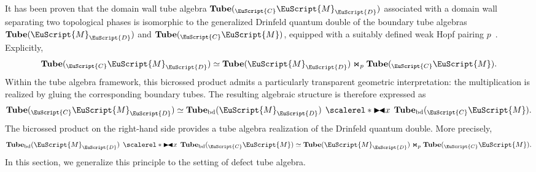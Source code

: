 \documentclass[a4paper,11pt]{article}
\theoremstyle{definition}
\theoremstyle{remark}
\newcommand\eC           {\EuScript{C}}
\newcommand\eD           {\EuScript{D}}
\newcommand\eM          {\EuScript{M}}
\newcommand\bicrosslr{%
	\mathrel{\scalerel*{\mathrel{\blacktriangleright}\joinrel\blacktriangleleft}{x}}}
\begin{document}
It has been proven that the domain wall tube algebra $\mathbf{Tube}({_{\eC}}\eM_{\eD})$ associated with a domain wall separating two topological phases is isomorphic to the generalized Drinfeld quantum double of the boundary tube algebras $\mathbf{Tube}(\eM_{\eD})$ and $\mathbf{Tube}({_{\eC}}\eM)$, equipped with a suitably defined weak Hopf pairing $p$~\cite{jia2025tube}. Explicitly,
\begin{equation}
    \mathbf{Tube}({_{\eC}}\eM_{\eD})
    \simeq
    \mathbf{Tube}(\eM_{\eD})
    \Join_{p}
    \mathbf{Tube}({_{\eC}}\eM).
\end{equation}
Within the tube algebra framework, this bicrossed product admits a particularly transparent geometric interpretation: the multiplication is realized by gluing the corresponding boundary tubes. The resulting algebraic structure is therefore expressed as
\begin{equation}
    \mathbf{Tube}({}_{\eC}\eM_{\eD})
    \simeq
    \mathbf{Tube}_{\rm bd}(\eM_{\eD})
    \,\bicrosslr\,
    \mathbf{Tube}_{\rm bd}({}_{\eC}\eM).
\end{equation}
The bicrossed product on the right-hand side provides a tube algebra realization of the Drinfeld quantum double. More precisely,
\begin{equation}
    \mathbf{Tube}_{\rm bd}(\eM_{\eD})
    \,\bicrosslr\,
    \mathbf{Tube}_{\rm bd}({}_{\eC}\eM)
    \simeq
    \mathbf{Tube}(\eM_{\eD})
    \Join_{p}
    \mathbf{Tube}({_{\eC}}\eM).
\end{equation}
In this section, we generalize this principle to the setting of defect tube algebra. 
\end{document}
